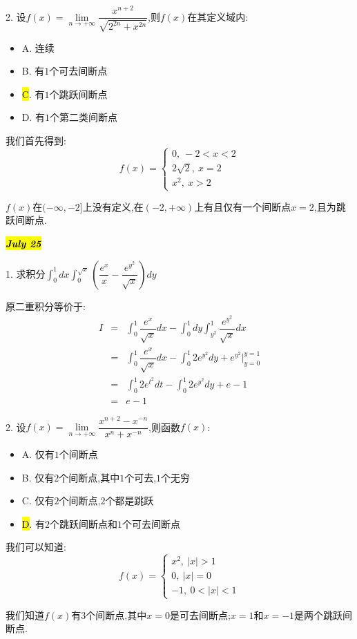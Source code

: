 2. 设$f(x)=\lim\limits_{n\rightarrow+\infty}\dfrac{x^{n+2}}{\sqrt{2^{2n}+x^{2n}}}$,则$f(x)$在其定义域内: 
\begin{itemize}
	\item A. 连续
	\item B. 有$1$个可去间断点
	\item \hl{C}. 有$1$个跳跃间断点
	\item D. 有$1$个第二类间断点
\end{itemize}
\begin{solution}
	
	我们首先得到: 
	$$f(x)=\left\lbrace
	\begin{array}{l}
		0,\ -2<x<2\\ 2\sqrt{2},\ x=2\\x^2,\ x>2
	\end{array}
	\right. $$
	
	$f(x)$在$(-\infty,-2]$上没有定义,在$(-2,+\infty)$上有且仅有一个间断点$x=2$,且为跳跃间断点.
\end{solution}

\hl{\textbf{\textit{July 25}}}

1. 求积分$\int_{0}^{1}dx\int_{0}^{\sqrt{x}}(\dfrac{e^x}{x}-\dfrac{e^{y^2}}{\sqrt{x}})dy$
\begin{solution}
	
	原二重积分等价于: 
	\begin{eqnarray*}
		I&=&\int_{0}^{1}\dfrac{e^x}{\sqrt{x}}dx-\int_{0}^{1}dy\int_{y^2}^{1}\dfrac{e^{y^2}}{\sqrt{x}}dx\\
		&=&\int_{0}^{1}\dfrac{e^x}{\sqrt{x}}dx-\int_{0}^{1}2e^{y^2}dy+e^{y^2}|_{y=0}^{y=1}\\
		&=&\int_{0}^{1}2e^{t^2}dt-\int_{0}^{1}2e^{y^2}dy+e-1\\
		&=&e-1
	\end{eqnarray*}
\end{solution}

2. 设$f(x)=\lim\limits_{n\rightarrow +\infty}\dfrac{x^{n+2}-x^{-n}}{x^n+x^{-n}}$,则函数$f(x)$: 
\begin{itemize}
	\item A. 仅有$1$个间断点
	\item B. 仅有$2$个间断点,其中$1$个可去,$1$个无穷
	\item C. 仅有$2$个间断点,$2$个都是跳跃
	\item \hl{D}. 有$2$个跳跃间断点和$1$个可去间断点
\end{itemize}
\begin{solution}
	
	我们可以知道: 
	$$f(x)=\left\lbrace
	\begin{array}{l}
		x^2,\ |x|>1\\
		0, \ |x|=0\\
		-1,\ 0<|x|<1
	\end{array}
	\right. $$
	
	我们知道$f(x)$有$3$个间断点,其中$x=0$是可去间断点;$x=1$和$x=-1$是两个跳跃间断点.
\end{solution}

